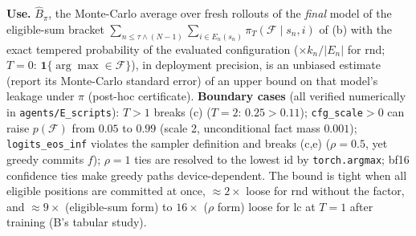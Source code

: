 \documentclass[11pt]{article}
\newcommand{\F}{\mathcal{F}}
\begin{document}
\noindent\textbf{Use.} $\hat B_\pi$, the Monte-Carlo average over fresh rollouts of the \emph{final} model of the eligible-sum
bracket $\sum_{n\le\tau\wedge(N-1)}\sum_{i\in E_n(s_n)}\pi_T(\F\mid s_n,i)$ of (b) with the exact tempered probability of the evaluated
configuration ($\times k_n/|E_n|$ for rnd; $T=0$: $\mathbf{1}\{\arg\max\in\F\}$), in
deployment precision, is an unbiased estimate (report its Monte-Carlo standard error) of an upper bound on that model's leakage under $\pi$ (post-hoc
certificate). \textbf{Boundary cases} (all verified numerically in \texttt{agents/E\_scripts}): $T>1$ breaks (c)
($T=2$: $0.25>0.11$); \texttt{cfg\_scale}$>0$ can raise $p(\F)$ from $0.05$ to $0.99$ (scale 2, unconditional fact mass $0.001$); \texttt{logits\_eos\_inf} violates the sampler definition and breaks (c,e) ($\rho=0.5$, yet greedy commits $f$);
$\rho=1$ ties are resolved to the lowest id by \texttt{torch.argmax}; bf16 confidence ties make greedy paths device-dependent.
The bound is tight when all eligible positions are committed at once, $\approx2\times$ loose for rnd without the factor,
and $\approx9\times$ (eligible-sum form) to $16\times$ ($\rho$ form) loose for lc at $T=1$ after training (B's tabular study).
\end{document}
